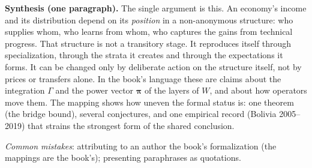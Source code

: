 \documentclass[../solutions_manual.tex]{subfiles}
\begin{document}
 \textbf{Synthesis (one paragraph).} The single argument is this. An economy's income and its distribution depend on its \emph{position} in a non-anonymous structure: who supplies whom, who learns from whom, who captures the gains from technical progress. That structure is not a transitory stage. It reproduces itself through specialization, through the strata it creates and through the expectations it forms. It can be changed only by deliberate action on the structure itself, not by prices or transfers alone. In the book's language these are claims about the integration $\Gamma$ and the power vector $\boldsymbol{\pi}$ of the layers of $W$, and about how operators move them. The mapping shows how uneven the formal status is: one theorem (the bridge bound), several conjectures, and one empirical record (Bolivia 2005--2019) that strains the strongest form of the shared conclusion.

\emph{Common mistakes}: attributing to an author the book's formalization (the mappings are the book's); presenting paraphrases as quotations.

\endgroup
\end{document}
